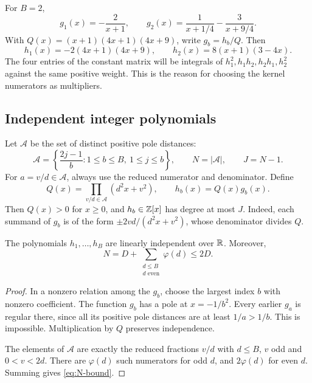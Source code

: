 \begin{example}\label{ex:two-kernels}
For $B=2$,
\[
 g_1(x)=-\frac2{x+1},\qquad
 g_2(x)=\frac1{x+1/4}-\frac3{x+9/4}.
\]
With $Q(x)=(x+1)(4x+1)(4x+9)$, write $g_b=h_b/Q$. Then
\[
 h_1(x)=-2(4x+1)(4x+9),\qquad
 h_2(x)=8(x+1)(3-4x).
\]
The four entries of the constant matrix will be integrals of
$h_1^2,h_1h_2,h_2h_1,h_2^2$ against the same positive weight.
This is the reason for choosing the kernel numerators as multipliers.
\end{example}

\subsection{Independent integer polynomials}

Let $\mathcal A$ be the set of distinct positive pole distances:
\[
 \mathcal A=\left\{\frac{2j-1}{b}:1\le b\le B,\ 1\le j\le b\right\},
 \qquad N=|\mathcal A|,\qquad J=N-1.
\]
For $a=v/d\in\mathcal A$, always use the reduced numerator and
denominator. Define
\begin{equation}\label{eq:Q-h}
 Q(x)=\prod_{v/d\in\mathcal A}(d^2x+v^2),\qquad
 h_b(x)=Q(x)g_b(x).
\end{equation}
Then $Q(x)>0$ for $x\ge0$, and $h_b\in\mathbb Z[x]$ has degree at most
$J$. Indeed, each summand of $g_b$ is of the form
$\pm2vd/(d^2x+v^2)$, whose denominator divides $Q$.

\begin{lemma}\label{lem:kernel-independence}
The polynomials $h_1,\ldots,h_B$ are linearly independent over $\mathbb R$.
Moreover,
\begin{equation}\label{eq:N-bound}
 N=D+\sum_{\substack{d\le B\\d\text{ even}}}\varphi(d)\le2D.
\end{equation}
\end{lemma}
\begin{proof}
In a nonzero relation among the $g_b$, choose the largest index $b$
with nonzero coefficient. The function $g_b$ has a pole at
$x=-1/b^2$. Every earlier $g_a$ is regular there, since all its
positive pole distances are at least $1/a>1/b$. This is impossible.
Multiplication by $Q$ preserves independence.

The elements of $\mathcal A$ are exactly the reduced fractions
$v/d$ with $d\le B$, $v$ odd and $0<v<2d$. There are $\varphi(d)$
such numerators for odd $d$, and $2\varphi(d)$ for even $d$.
Summing gives \eqref{eq:N-bound}.
\end{proof}

